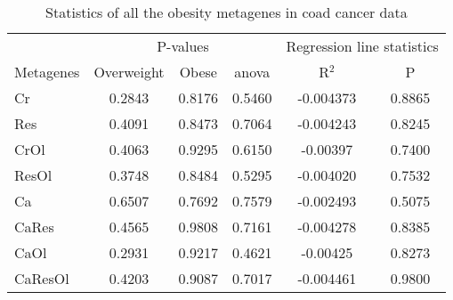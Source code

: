 \begin{appendices}
\begin{table}[htpb]
	\centering
	\caption{Statistics of all the obesity metagenes in \gls{coad} cancer data}
	\label{tab:degmetacoad}
	\begin{threeparttable}
		\begin{tabular}{lccccc}
			& \multicolumn{3}{c}{ P-values} & \multicolumn{2}{c}{ Regression line statistics}\\
			\cmidrule(r){2-4} \cmidrule(r){5-6}
			Metagenes &  Overweight &  Obese &  \gls{anova} &  R$^2$ &  P \\
			\hline
			\hline
			\rule{0pt}{2.25ex}Cr      & 0.2843                      & 0.8176  & 0.5460             & -0.004373  & 0.8865              \\
            Res     & 0.4091                      & 0.8473  & 0.7064             & -0.004243  & 0.8245              \\
            CrOl    & 0.4063                      & 0.9295  & 0.6150             & -0.00397   & 0.7400              \\
            ResOl   & 0.3748                      & 0.8484  & 0.5295             & -0.004020  & 0.7532              \\
            Ca      & 0.6507                      & 0.7692  & 0.7579             & -0.002493  & 0.5075              \\
            CaRes   & 0.4565                      & 0.9808  & 0.7161             & -0.004278  & 0.8385              \\
            CaOl    & 0.2931                      & 0.9217  & 0.4621             & -0.00425   & 0.8273              \\
            CaResOl & 0.4203                      & 0.9087  & 0.7017             & -0.004461  & 0.9800              \\
			\hline
			\hline
		\end{tabular}
	\end{threeparttable}
\end{table}


\end{appendices}

